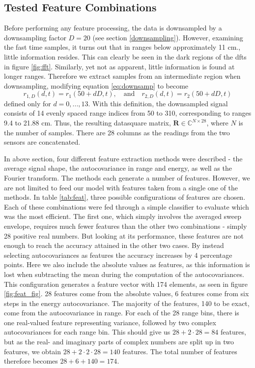 \subsection{Tested Feature Combinations}
Before performing any feature processing, the data is downsampled by a downsampling factor $D=20$ (see section \ref{downsampling}). However, examining the fast time samples, it turns out that in ranges below approximately 11 cm., little information resides. This can clearly be seen in the dark regions of the \gls{dft}s in figure \ref{fig:fft}. Similarly, yet not as apparent, little information is found at longer ranges. Therefore we extract samples from an intermediate region when downsampling, modifying equation \eqref{eq:downsamp} to become
\begin{equation}
	r_{1,D}(d, t) = r_{1}(50+dD,t), 
	\quad \text{and} \quad r_{2,D}(d,t) = r_{2}(50+dD,t)
\end{equation}
defined only for $d=0,...,13$. With this definition, the downsampled signal consists of 14 evenly spaced range indices from 50 to 310, corresponding to ranges 9.4 to 21.88 cm. Thus, the resulting datasquare matrix, $\mathbf{R}\in \mathbb{C}^{N\times 28}$, where $N$ is the number of samples. There are 28 columns as the readings from the two sensors are concatenated. 

In above section, four different feature extraction methods were described - the average signal shape, the autocovariance in range and energy, as well as the Fourier transform. The methods each generate a number of features. However, we are not limited to feed our model with features taken from a single one of the methods. In table \ref{tab:feat}, three possible configurations of features are chosen. Each of these combinations were fed through a simple classifier to evaluate which was the most efficient. The first one, which simply involves the averaged sweep envelope, requires much fewer features than the other two combinations - simply 28 positive real numbers. But looking at its performance, these features are not enough to reach the accuracy attained in the other two cases. By instead selecting autocovariances as features the accuracy increases by 4 percentage points. Here we also include the absolute values as features, as this information is lost when subtracting the mean during the computation of the autocovariances. This configuration generates a feature vector with 174 elements, as seen in figure \ref{fig:feat_fig}. 28 features come from the absolute values, 6 features come from six steps in the energy autocovariance. The majority of the features, 140 to be exact, come from the autocovariance in range. For each of the 28 range bins, there is one real-valued feature representing variance, followed by two complex autocovariances for each range bin. This should give us $28+2\cdot 28=84$ features, but as the real- and imaginary parts of complex numbers are split up in two features, we obtain $28+2\cdot2\cdot 28=140$ features. The total number of features therefore becomes $28+6+140=174$.


